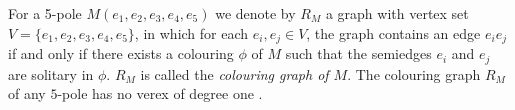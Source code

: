 For a 5-pole $M(e_1,e_2,e_3,e_4,e_5)$ we denote by $R_M$ a graph with vertex set $V=\{e_1,e_2,e_3,e_4,e_5\}$, in which for each $e_i,e_j\in V$, the graph contains an edge $e_ie_j$ if and only if there exists a colouring $\phi$ of $M$ such that the semiedges $e_i$ and $e_j$ are solitary in $\phi$. $R_M$ is called the \textit{colouring graph of $M$}.
The colouring graph $R_M$ of any $5$-pole has no verex of degree one \cite{Preissmann1983}.




%


